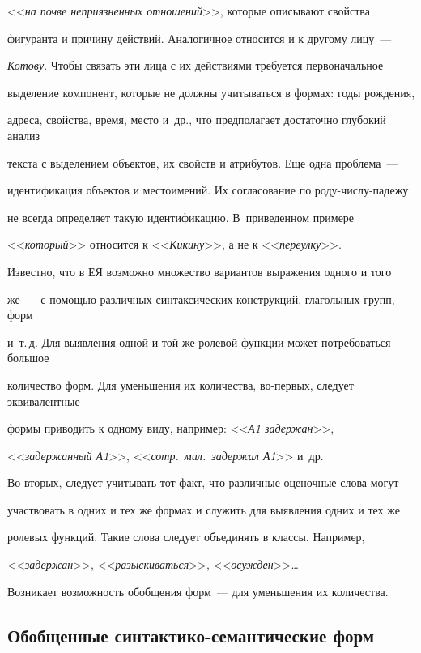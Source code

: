 <<\textit{на почве неприязненных отношений}>>, которые описывают свойства 


фигуранта и причину действий. Аналогичное относится и к другому лицу~--- 


\textit{Котову}. Чтобы связать эти лица с их действиями требуется первоначальное 


выделение компонент, которые не должны учитываться в формах: годы рождения, 


адреса, свойства, время, место и~др., что предполагает достаточно глубокий анализ 


текста с выделением объектов, их свойств и атрибутов. Еще одна проблема~--- 


идентификация объектов и местоимений. Их согласование по ро\-ду-чис\-лу-па\-де\-жу 


не всегда определяет такую идентификацию. В~приведенном примере  


<<\textit{который}>> относится к <<\textit{Кикину}>>, а не к <<\textit{переулку}>>.     





          Известно, что в ЕЯ возможно множество вариантов выражения одного и того 


же~--- с помощью различных синтаксических конструкций, глагольных групп, форм 


и~т.\,д. Для выявления одной и той же ролевой функции может потребоваться большое 


количество форм. Для уменьшения их количества, во-пер\-вых, следует эквивалентные 


формы приводить к одному виду, например: <<\textit{А1 задержан}>>, 


<<\textit{задержанный А1}>>, <<\textit{сотр.\ мил.\ задержал А1}>> и~др. 


Во-вторых, следует учитывать тот факт, что различные оценочные слова могут 


участвовать в одних и тех же формах и служить для выявления одних и тех же 


ролевых функций. Такие слова следует объединять в классы. Например, 


<<\textit{задержан}>>, <<\textit{разыскиваться}>>, <<\textit{осужден}>>\ldots 


Возникает возможность обобщения форм~--- для уменьшения их количества.





\subsection{Обобщенные синтактико-семантические форм}





